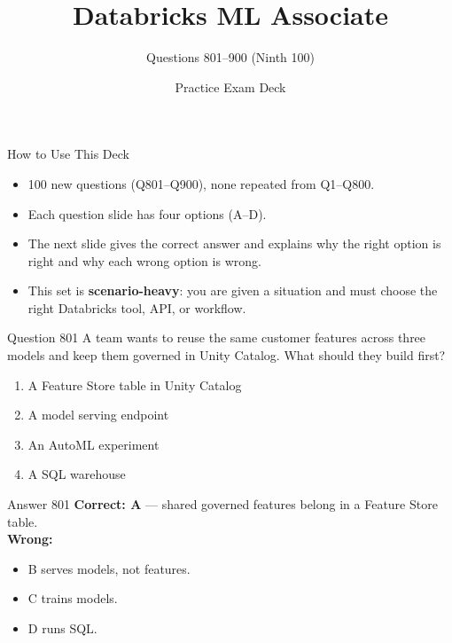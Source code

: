 \documentclass[aspectratio=169,11pt]{beamer}
\title{Databricks ML Associate}
\subtitle{Questions 801--900 (Ninth 100)}
\author{Practice Exam Deck}
\date{}
\begin{document}
	
	\begin{frame}
		\titlepage
	\end{frame}
	
	\begin{frame}{How to Use This Deck}
		\begin{itemize}
			\item 100 new questions (Q801--Q900), none repeated from Q1--Q800.
			\item Each question slide has four options (A--D).
			\item The next slide gives the correct answer and explains why the right option is right and why each wrong option is wrong.
			\item This set is \textbf{scenario-heavy}: you are given a situation and must choose the right Databricks tool, API, or workflow.
		\end{itemize}
	\end{frame}
	
	\begin{frame}{Question 801}
		A team wants to reuse the same customer features across three models and keep them governed in Unity Catalog. What should they build first?
		\begin{enumerate}[label=\Alph*.]
			\item A Feature Store table in Unity Catalog
			\item A model serving endpoint
			\item An AutoML experiment
			\item A SQL warehouse
		\end{enumerate}
	\end{frame}
	\begin{frame}{Answer 801}
		\textbf{Correct: A} --- shared governed features belong in a Feature Store table.\\
		\vspace{0.5em}
		\textbf{Wrong:}
		\begin{itemize}
			\item B serves models, not features.
			\item C trains models.
			\item D runs SQL.
		\end{itemize}
	\end{frame}
	
\end{document}
